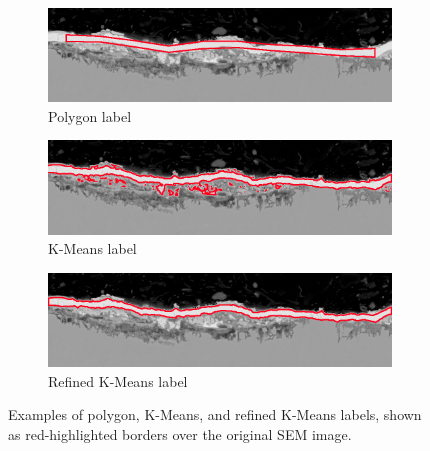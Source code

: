 \begin{figure}[H]
    \centering

    \begin{subfigure}{0.8\textwidth}
        \centering
        \includegraphics[width=\linewidth]{PICTURES/MASK/2.png}
        \caption{Polygon label}
        \label{fig:polygon_sem_color}
    \end{subfigure}

    \begin{subfigure}{0.8\textwidth}
        \centering
        \includegraphics[width=\linewidth]{PICTURES/MASK/1.png}
        \caption{K-Means label}
        \label{fig:kmean_sem_color}
    \end{subfigure}

    \begin{subfigure}{0.8\textwidth}
        \centering
        \includegraphics[width=\linewidth]{PICTURES/MASK/3.png}
        \caption{Refined K-Means label}
        \label{fig:3}
    \end{subfigure}

    \caption{Examples of polygon, K-Means, and refined K-Means labels, shown as red-highlighted borders over the original SEM image.}    \label{fig:all-masks}
\end{figure}


